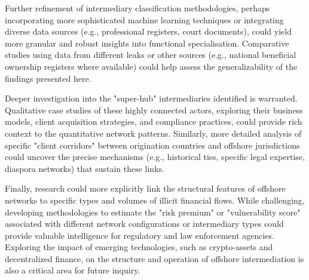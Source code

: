 Further refinement of intermediary classification methodologies, perhaps incorporating more sophisticated machine learning techniques or integrating diverse data sources (e.g., professional registers, court documents), could yield more granular and robust insights into functional specialisation. Comparative studies using data from different leaks or other sources (e.g., national beneficial ownership registers where available) could help assess the generalizability of the findings presented here.

Deeper investigation into the "super-hub" intermediaries identified is warranted. Qualitative case studies of these highly connected actors, exploring their business models, client acquisition strategies, and compliance practices, could provide rich context to the quantitative network patterns. Similarly, more detailed analysis of specific "client corridors" between origination countries and offshore jurisdictions could uncover the precise mechanisms (e.g., historical ties, specific legal expertise, diaspora networks) that sustain these links.

Finally, research could more explicitly link the structural features of offshore networks to specific types and volumes of illicit financial flows. While challenging, developing methodologies to estimate the "risk premium" or "vulnerability score" associated with different network configurations or intermediary types could provide valuable intelligence for regulatory and law enforcement agencies. Exploring the impact of emerging technologies, such as crypto-assets and decentralized finance, on the structure and operation of offshore intermediation is also a critical area for future inquiry.
